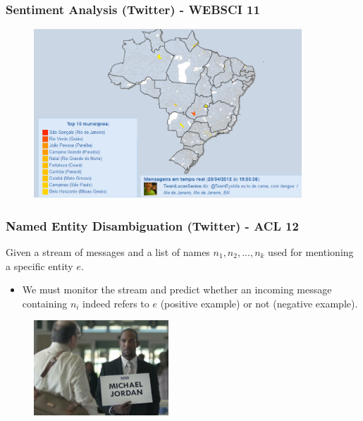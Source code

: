 \documentclass{beamer}
\begin{document}
\begin{frame}\frametitle{Sentiment Analysis (Twitter) - WEBSCI 11}

\begin{figure}
\centering
\includegraphics[height=2.50in]{dengue.eps}
\end{figure}

\end{frame}

\begin{frame}\frametitle{Named Entity Disambiguation (Twitter) - ACL 12}

Given a stream of messages and a list of
names $n_1, n_2, . . . , n_k$ used for mentioning a specific entity $e$.

\begin{itemize}
\item We must monitor the stream
and predict whether an incoming message containing
$n_i$ indeed refers to $e$ (positive example) or not
(negative example).
\end{itemize}

\begin{figure}
\centering
\includegraphics[height=1.40in]{mj.eps}
\end{figure}

\end{frame}
\end{document}
